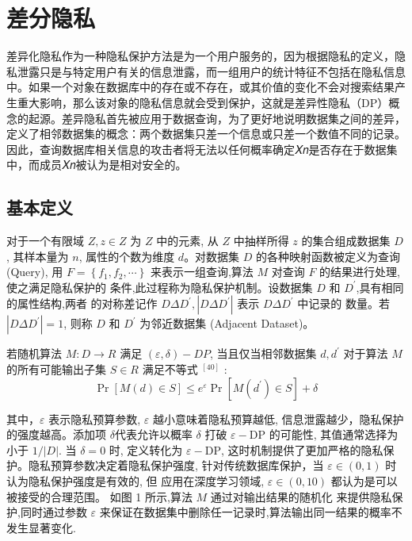 \section{差分隐私}
差异化隐私作为一种隐私保护方法是为一个用户服务的，因为根据隐私的定义，隐私泄露只是与特定用户有关的信息泄露，而一组用户的统计特征不包括在隐私信息中。如果一个对象在数据库中的存在或不存在，或其价值的变化不会对搜索结果产生重大影响，那么该对象的隐私信息就会受到保护，这就是差异性隐私（DP）概念的起源。差异隐私首先被应用于数据查询，为了更好地说明数据集之间的差异，定义了相邻数据集的概念：两个数据集只差一个信息或只差一个数值不同的记录。因此，查询数据库相关信息的攻击者将无法以任何概率确定𝑋𝑛是否存在于数据集中，而成员𝑋𝑛被认为是相对安全的。


\subsection{基本定义}
对于一个有限域 $Z, z \in Z$ 为 $Z$ 中的元素, 从 $Z$ 中抽样所得 $z$ 的集合组成数据集 $D$, 其样本量为 $n$, 属性的个数为维度 $d$。对数据集 $D$ 的各种映射函数被定义为查询 (Query), 用 $F=\left\{f_{1}, f_{2}, \cdots\right\}$ 来表示一组查询,算法 $M$ 对查询 $F$ 的结果进行处理,使之满足隐私保护的 条件,此过程称为隐私保护机制。设数据集 $D$ 和 $D^{\prime}$,具有相同的属性结构,两者 的对称差记作 $D \Delta D^{\prime},\left|D \Delta D^{\prime}\right|$ 表示 $D \Delta D^{\prime}$ 中记录的 数量。若 $\left|D \Delta D^{\prime}\right|=1$, 则称 $D$ 和 $D^{\prime}$ 为邻近数据集 (Adjacent Dataset)。


\begin{define}[成立条件]\label{成立条件}

若随机算法 $M: D \rightarrow R$ 满足 $(\varepsilon, \delta)-D P$, 当且仅当相邻数据集 $d, d^{\prime}$ 对于算法 $M$ 的所有可能输出子集 $S \in R$ 满足不等式 $^{[40]}$ :
$$
\operatorname{Pr}[M(d) \in S] \leq e^{\varepsilon} \operatorname{Pr}\left[M\left(d^{\prime}\right) \in S\right]+\delta
$$

其中，$\varepsilon$ 表示隐私预算参数, $\varepsilon$ 越小意味着隐私预算越低, 信息泄露越少，隐私保护的强度越高。添加项 $\delta$代表允许以概率 $\delta$ 打破 $\varepsilon-\mathrm{DP}$ 的可能性, 其值通常选择为小于 $1 /|D|$. 当 $\delta=0$ 时, 定义转化为 $\varepsilon-\mathrm{DP}$, 这时机制提供了更加严格的隐私保护。隐私预算参数决定着隐私保护强度, 针对传统数据库保护，当 $\varepsilon \in(0,1)$ 时认为隐私保护强度是有效的, 但 应用在深度学习领域, $\varepsilon \in(0,10)$ 都认为是可以被接受的合理范围。
如图 1 所示,算法 $M$ 通过对输出结果的随机化 来提供隐私保护,同时通过参数 $\varepsilon$ 来保证在数据集中删除任一记录时,算法输出同一结果的概率不发生显著变化.
\end{define}

